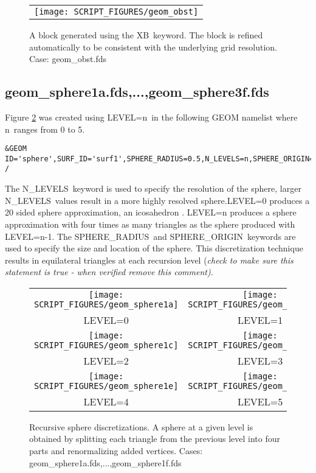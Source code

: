 \documentclass[12pt]{article}
\begin{document}
\begin{figure}
\begin{center}
\begin{tabular}{c}
 \texttt{[image: SCRIPT\_FIGURES/geom\_obst]}
  \end{tabular}
\end{center}
 \caption{A block generated using the {\ct XB}\ keyword.  The block is refined automatically to be consistent with the underlying grid resolution. Case: geom\_obst.fds}
\label{fig:geom_obst}
\end{figure}

\subsection{geom\_sphere1a.fds,...,geom\_sphere3f.fds}
Figure \ref{fig:geom_sphere} was created using {\ct LEVEL=n}\
in the following GEOM namelist
where {\ct n}\ ranges from 0 to 5.

{\scriptsize
\begin{verbatim}
&GEOM ID='sphere',SURF_ID='surf1',SPHERE_RADIUS=0.5,N_LEVELS=n,SPHERE_ORIGIN=0.0,0.0,0.0 /
\end{verbatim}
}

The {\ct N\_LEVELS}\ keyword is used
to specify the resolution of the sphere, larger {\ct N\_LEVELS}\ values result
in a more highly resolved sphere.{\ct LEVEL=0} produces a 20 sided sphere approximation, an icosahedron .
{\ct LEVEL=n} produces a sphere approximation with four times as many triangles as the
sphere produced with {\ct LEVEL=n-1}.
The {\ct SPHERE\_RADIUS}\ and {\ct SPHERE\_ORIGIN}\ keywords are used to specify
the size and location of the sphere.  This discretization technique results in equilateral triangles at each recursion level {(\em check to make sure this statement is true - when verified remove this comment)}.

\begin{figure}
\begin{center}
\begin{tabular}{cc}
 \texttt{[image: SCRIPT\_FIGURES/geom\_sphere1a]}&
 \texttt{[image: SCRIPT\_FIGURES/geom\_sphere1b]}\\
 LEVEL=0&LEVEL=1\\
 \texttt{[image: SCRIPT\_FIGURES/geom\_sphere1c]}&
 \texttt{[image: SCRIPT\_FIGURES/geom\_sphere1d]}\\
 LEVEL=2&LEVEL=3\\
 \texttt{[image: SCRIPT\_FIGURES/geom\_sphere1e]}&
 \texttt{[image: SCRIPT\_FIGURES/geom\_sphere1f]}\\
 LEVEL=4&LEVEL=5\\
  \end{tabular}
\end{center}
 \caption{Recursive sphere discretizations.  A sphere at a given level is
 obtained by splitting each triangle from the previous level into four parts and renormalizing added vertices. Cases: geom\_sphere1a.fds,...,geom\_sphere1f.fds}
\label{fig:geom_sphere}
\end{figure}
\end{document}
